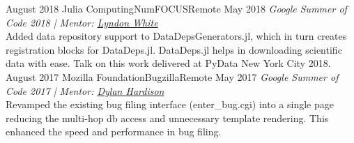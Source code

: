 \begin{experiences}
   \researchexperience
    {August 2018}   {Julia Computing}{NumFOCUS}{Remote}
    {May 2018} {\textit{Google Summer of Code 2018 | Mentor: \href{https://white.ucc.asn.au/}{Lyndon White}}\\
    Added data repository support to DataDepsGenerators.jl, which in turn creates registration blocks for DataDeps.jl. DataDeps.jl helps in downloading scientific data with ease. Talk on this work delivered at PyData New York City 2018.
                    }
  \emptySeparator
   \researchexperience
    {August 2017}   {Mozilla Foundation}{Bugzilla}{Remote}
    {May 2017} {\textit{Google Summer of Code 2017 | Mentor: \href{https://www.linkedin.com/in/dylanwh}{Dylan Hardison}}\\
    Revamped the existing bug filing interface (enter\_bug.cgi) into a single page reducing the multi-hop db access and unnecessary template rendering. This enhanced the speed and performance in bug filing.
                    }
\end{experiences}
\vspace{-3mm}